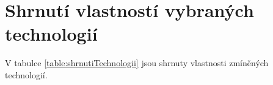 \section{Shrnutí vlastností vybraných technologií}
V tabulce \ref{table:shrnutiTechnologii} jsou shrnuty vlastnosti zmíněných technologií.   




